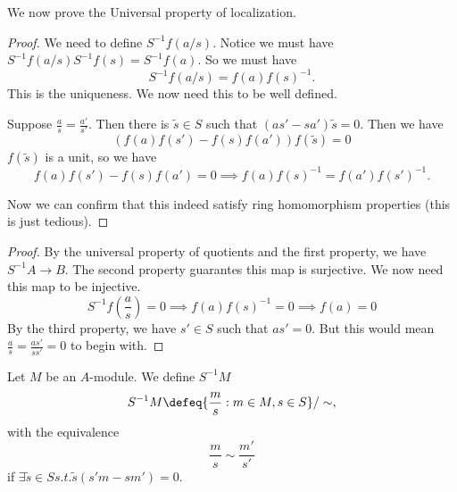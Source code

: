 \section{}
We now prove the Universal property of localization.
\begin{proof}
    We need to define $S^{-1}f(a/s)$.
    Notice we must have $S^{-1}f(a/s)S^{-1}f(s) = S^{-1}f(a)$. So we must have \[
        S^{-1}f(a/s)= f(a)f(s)^{-1}.
    \]
    This is the uniqueness.
    We now need this to be well defined.

    Suppose $\frac{a}{s}=\frac{a'}{s'}$. Then there is $\tilde{s}\in S$ such that $(as'-sa')\tilde{s}=0$.
    Then we have \[
    (f(a)f(s')-f(s)f(a'))f(\tilde{s}) =0
    \]
    $f(\tilde{s})$ is a unit, so we have \[
        f(a)f(s')-f(s)f(a')=0\implies f(a)f(s)^{-1}=f(a')f(s')^{-1}.
    \]

    Now we can confirm that this indeed satisfy ring homomorphism properties (this is just tedious).
\end{proof}

\begin{proof}
    By the universal property of quotients and the first property, we have $S^{-1}A\to B$. The second property guarantes this map is surjective. 
    We now need this map to be injective. 
    \[
    S^{-1}f(\frac{a}{s})=0 \implies f(a)f(s)^{-1}=0 \implies f(a)=0
    \]
    By the third property, we have $s'\in S$ such that $as'=0$. But this would mean $\frac{a}{s}=\frac{as'}{ss'}=0$ to begin with.
\end{proof}

Let $M$ be an $A$-module. We define $S^{-1}M$ \[
S^{-1}M\defeq \{\frac{m}{s}: m\in M, s\in S\}/\sim,
\]
with the equivalence\[
\frac{m}{s}\sim\frac{m'}{s'}
\]
if $\exists \tilde{s}\in S s.t. \tilde{s}(s'm-sm')=0$.

